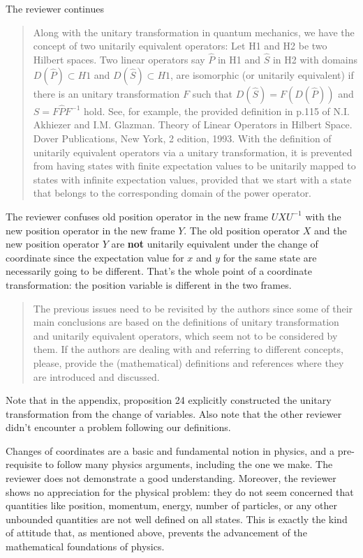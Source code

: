 \documentclass[11pt, executivepaper]{article}
\begin{document}
The reviewer continues
\begin{quote}
Along with the unitary transformation in quantum mechanics, we have the
concept of two unitarily equivalent operators: Let H1 and H2 be two Hilbert
spaces. Two linear operators say $\hat{P}$ in H1 and $\hat{S}$ in H2 with domains $D(\hat{P}) \subset H1$
and $D(\hat{S}) \subset H1$, are isomorphic (or unitarily equivalent) if there is an unitary
transformation $F$ such that $D(\hat{S}) = F(D(\hat{P}))$ and $S = F\hat{P}F^{-1}$ hold. See, for
example, the provided definition in p.115 of N.I. Akhiezer and I.M. Glazman.
Theory of Linear Operators in Hilbert Space. Dover Publications, New York, 2
edition, 1993.
With the definition of unitarily equivalent operators via a unitary transformation,
it is prevented from having states with finite expectation values to
be unitarily mapped to states with infinite expectation values, provided that
we start with a state that belongs to the corresponding domain of the power
operator.
\end{quote}
The reviewer confuses old position operator in the new frame $U X U^{-1}$  with the new position operator in the new frame $Y$. The old position operator $X$ and the new position operator $Y$ are \textbf{not} unitarily equivalent under the change of coordinate since the expectation value for $x$ and $y$ for the same state are necessarily going to be different. That's the whole point of a coordinate transformation: the position variable is different in the two frames.

\begin{quote}
The previous issues need to be revisited by the authors since some of their
main conclusions are based on the definitions of unitary transformation and
unitarily equivalent operators, which seem not to be considered by them. If
the authors are dealing with and referring to different concepts, please, provide
the (mathematical) definitions and references where they are introduced and
discussed.
\end{quote}
Note that in the appendix, proposition 24 explicitly constructed the unitary transformation from the change of variables. Also note that the other reviewer didn't encounter a problem following our definitions.

Changes of coordinates are a basic and fundamental notion in physics, and a pre-requisite to follow many physics arguments, including the one we make. The reviewer does not demonstrate a good understanding. Moreover, the reviewer shows no appreciation for the physical problem: they do not seem concerned that quantities like position, momentum, energy, number of particles, or any other unbounded quantities are not well defined on all states. This is exactly the kind of attitude that, as mentioned above, prevents the advancement of the mathematical foundations of physics.
\end{document}
